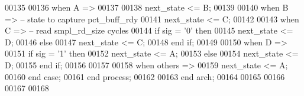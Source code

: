 \begin{DoxyCode}
00135       
00136         \textcolor{keywordflow}{when} \textcolor{vhdlchar}{A} \textcolor{vhdlchar}{=}\textcolor{vhdlchar}{>}          
00137            
00138               \textcolor{vhdlchar}{next_state} \textcolor{vhdlchar}{<=} \textcolor{vhdlchar}{B};
00139        
00140       \textcolor{keywordflow}{when} \textcolor{vhdlchar}{B} \textcolor{vhdlchar}{=}\textcolor{vhdlchar}{>}\textcolor{keyword}{        -- state to capture pct\_buff\_rdy }
00141             \textcolor{vhdlchar}{next_state} \textcolor{vhdlchar}{<=} \textcolor{vhdlchar}{C};
00142                
00143       \textcolor{keywordflow}{when} \textcolor{vhdlchar}{C} \textcolor{vhdlchar}{=}\textcolor{vhdlchar}{>}\textcolor{keyword}{          -- read smpl\_rd\_size cycles}
00144          \textcolor{keywordflow}{if} \textcolor{vhdlchar}{sig} \textcolor{vhdlchar}{=} \textcolor{vhdlchar}{'}\textcolor{vhdllogic}{}\textcolor{vhdllogic}{0}\textcolor{vhdlchar}{'} \textcolor{keywordflow}{then} 
00145             \textcolor{vhdlchar}{next_state} \textcolor{vhdlchar}{<=} \textcolor{vhdlchar}{D};
00146          \textcolor{keywordflow}{else} 
00147             \textcolor{vhdlchar}{next_state} \textcolor{vhdlchar}{<=} \textcolor{vhdlchar}{C};
00148          \textcolor{keywordflow}{end} \textcolor{keywordflow}{if};
00149             
00150         \textcolor{keywordflow}{when} \textcolor{vhdlchar}{D} \textcolor{vhdlchar}{=}\textcolor{vhdlchar}{>}
00151             \textcolor{keywordflow}{if} \textcolor{vhdlchar}{sig} \textcolor{vhdlchar}{=} \textcolor{vhdlchar}{'}\textcolor{vhdllogic}{}\textcolor{vhdllogic}{1}\textcolor{vhdlchar}{'} \textcolor{keywordflow}{then}
00152                 \textcolor{vhdlchar}{next_state} \textcolor{vhdlchar}{<=} \textcolor{vhdlchar}{A};
00153             \textcolor{keywordflow}{else}
00154                 \textcolor{vhdlchar}{next_state} \textcolor{vhdlchar}{<=} \textcolor{vhdlchar}{D};
00155             \textcolor{keywordflow}{end} \textcolor{keywordflow}{if};       
00156       
00157             
00158         \textcolor{keywordflow}{when} \textcolor{keywordflow}{others} \textcolor{vhdlchar}{=}\textcolor{vhdlchar}{>} 
00159             \textcolor{vhdlchar}{next_state} \textcolor{vhdlchar}{<=} \textcolor{vhdlchar}{A};
00160     \textcolor{keywordflow}{end} \textcolor{keywordflow}{case};
00161 \textcolor{keywordflow}{end} \textcolor{keywordflow}{process};
00162   
00163 \textcolor{keywordflow}{end} \textcolor{vhdlchar}{arch};   
00164 
00165 
00166 
00167 
00168 
\end{DoxyCode}
